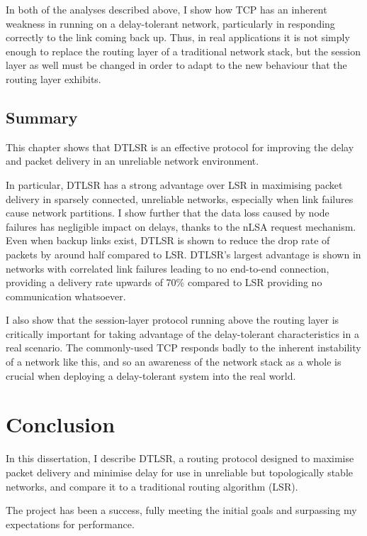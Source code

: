\documentclass[withindex,glossary,openany]{cam-thesis}
\begin{document}
In both of the analyses described above, I show how TCP has an inherent weakness in running on a delay-tolerant network, particularly in responding correctly to the link coming back up. Thus, in real applications it is not simply enough to replace the routing layer of a traditional network stack, but the session layer as well must be changed in order to adapt to the new behaviour that the routing layer exhibits.


\section{Summary}

This chapter shows that DTLSR is an effective protocol for improving the delay and packet delivery in an unreliable network environment.

In particular, DTLSR has a strong advantage over LSR in maximising packet delivery in sparsely connected, unreliable networks, especially when link failures cause network partitions. I show further that the data loss caused by node failures has negligible impact on delays, thanks to the nLSA request mechanism. Even when backup links exist, DTLSR is shown to reduce the drop rate of packets by around half compared to LSR. DTLSR's largest advantage is shown in networks with correlated link failures leading to no end-to-end connection, providing a delivery rate upwards of 70\% compared to LSR providing no communication whatsoever.

I also show that the session-layer protocol running above the routing layer is critically important for taking advantage of the delay-tolerant characteristics in a real scenario. The commonly-used TCP responds badly to the inherent instability of a network like this, and so an awareness of the network stack as a whole is crucial when deploying a delay-tolerant system into the real world.

\chapter{Conclusion}

In this dissertation, I describe DTLSR, a routing protocol designed to maximise packet delivery and minimise delay for use in unreliable but topologically stable networks, and compare it to a traditional routing algorithm (LSR).

The project has been a success, fully meeting the initial goals and surpassing my expectations for performance.
\end{document}
